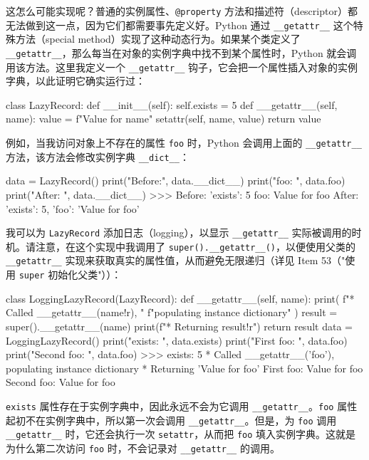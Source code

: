 这怎么可能实现呢？普通的实例属性、\texttt{@property} 方法和描述符（descriptor）都无法做到这一点，因为它们都需要事先定义好。Python 通过 \texttt{\_\_getattr\_\_} 这个特殊方法（special method）实现了这种动态行为。如果某个类定义了 \texttt{\_\_getattr\_\_}，那么每当在对象的实例字典中找不到某个属性时，Python 就会调用该方法。这里我定义一个 \texttt{\_\_getattr\_\_} 钩子，它会把一个属性插入对象的实例字典，以此证明它确实运行过：

\begin{codebox}[python]
class LazyRecord:
    def __init__(self):
        self.exists = 5
    def __getattr__(self, name):
        value = f"Value for {name}"
        setattr(self, name, value)
        return value
\end{codebox}

例如，当我访问对象上不存在的属性 \texttt{foo} 时，Python 会调用上面的 \texttt{\_\_getattr\_\_} 方法，该方法会修改实例字典 \texttt{\_\_dict\_\_}：

\begin{codebox}[python]
data = LazyRecord()
print("Before:", data.__dict__)
print("foo:   ", data.foo)
print("After: ", data.__dict__)
>>>
Before: {'exists': 5}
foo:    Value for foo
After:  {'exists': 5, 'foo': 'Value for foo'}
\end{codebox}

我可以为 \texttt{LazyRecord} 添加日志（logging），以显示 \texttt{\_\_getattr\_\_} 实际被调用的时机。请注意，在这个实现中我调用了 \texttt{super().\_\_getattr\_\_()}，以便使用父类的 \texttt{\_\_getattr\_\_} 实现来获取真实的属性值，从而避免无限递归（详见 Item 53（"使用 \texttt{super} 初始化父类"））：

\begin{codebox}[python]
class LoggingLazyRecord(LazyRecord):
    def __getattr__(self, name):
        print(
            f"* Called __getattr__({name!r}), "
            f"populating instance dictionary"
        )
        result = super().__getattr__(name)
        print(f"* Returning {result!r}")
        return result
data = LoggingLazyRecord()
print("exists:     ", data.exists)
print("First foo:  ", data.foo)
print("Second foo: ", data.foo)
>>>
exists:      5
* Called __getattr__('foo'), populating instance dictionary
* Returning 'Value for foo'
First foo:   Value for foo
Second foo:  Value for foo
\end{codebox}

\texttt{exists} 属性存在于实例字典中，因此永远不会为它调用 \texttt{\_\_getattr\_\_}。\texttt{foo} 属性起初不在实例字典中，所以第一次会调用 \texttt{\_\_getattr\_\_}。但是，为 \texttt{foo} 调用 \texttt{\_\_getattr\_\_} 时，它还会执行一次 \texttt{setattr}，从而把 \texttt{foo} 填入实例字典。这就是为什么第二次访问 \texttt{foo} 时，不会记录对 \texttt{\_\_getattr\_\_} 的调用。


